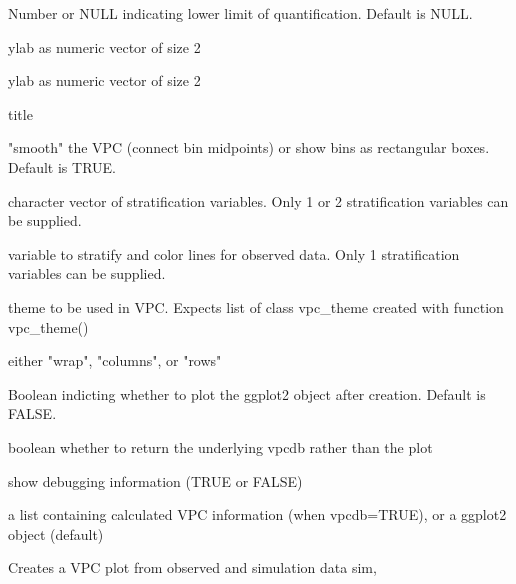 \documentclass[letterpaper]{book}
\begin{document}
\begin{Arguments}
\begin{ldescription}
\item[\code{lloq}] Number or NULL indicating lower limit of quantification. Default is NULL.

\item[\code{xlab}] ylab as numeric vector of size 2

\item[\code{ylab}] ylab as numeric vector of size 2

\item[\code{title}] title

\item[\code{smooth}] "smooth" the VPC (connect bin midpoints) or show bins as rectangular boxes. Default is TRUE.

\item[\code{stratify}] character vector of stratification variables. Only 1 or 2 stratification variables can be supplied.

\item[\code{stratify\_color}] variable to stratify and color lines for observed data. Only 1 stratification variables can be supplied.

\item[\code{vpc\_theme}] theme to be used in VPC. Expects list of class vpc\_theme created with function vpc\_theme()

\item[\code{facet}] either "wrap", "columns", or "rows"

\item[\code{plot}] Boolean indicting whether to plot the ggplot2 object after creation. Default is FALSE.

\item[\code{vpcdb}] boolean whether to return the underlying vpcdb rather than the plot

\item[\code{verbose}] show debugging information (TRUE or FALSE)
\end{ldescription}
\end{Arguments}
%
\begin{Value}
a list containing calculated VPC information (when vpcdb=TRUE), or a ggplot2 object (default)
\end{Value}
%
\begin{SeeAlso}\relax
{}
\end{SeeAlso}
%
\begin{Description}\relax
Creates a VPC plot from observed and simulation data
sim,
\end{Description}
\end{document}
